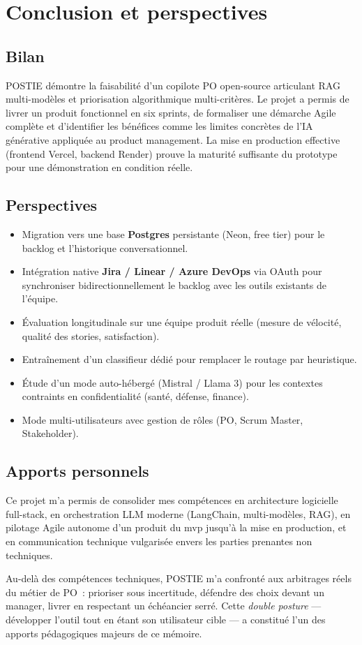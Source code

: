 \chapter{Conclusion et perspectives}
\label{ch:ccl}

\section{Bilan}
POSTIE démontre la faisabilité d'un copilote PO open-source
articulant RAG multi-modèles et priorisation algorithmique
multi-critères. Le projet a permis de livrer un produit fonctionnel
en six sprints, de formaliser une démarche Agile complète et
d'identifier les bénéfices comme les limites concrètes de l'IA
générative appliquée au product management. La mise en production
effective (frontend Vercel, backend Render) prouve la maturité
suffisante du prototype pour une démonstration en condition
réelle.

\section{Perspectives}
\begin{itemize}
  \item Migration vers une base \textbf{Postgres} persistante
        (Neon, free tier) pour le backlog et l'historique
        conversationnel.
  \item Intégration native \textbf{Jira / Linear / Azure DevOps}
        via OAuth pour synchroniser bidirectionnellement le backlog
        avec les outils existants de l'équipe.
  \item Évaluation longitudinale sur une équipe produit réelle
        (mesure de vélocité, qualité des stories, satisfaction).
  \item Entraînement d'un classifieur dédié pour remplacer le
        routage par heuristique.
  \item Étude d'un mode auto-hébergé (Mistral / Llama 3) pour les
        contextes contraints en confidentialité (santé, défense,
        finance).
  \item Mode multi-utilisateurs avec gestion de rôles
        (PO, Scrum Master, Stakeholder).
\end{itemize}

\section{Apports personnels}
Ce projet m'a permis de consolider mes compétences en architecture
logicielle full-stack, en orchestration LLM moderne (LangChain,
multi-modèles, RAG), en pilotage Agile autonome d'un produit du
\gls{mvp} jusqu'à la mise en production, et en communication
technique vulgarisée envers les parties prenantes non techniques.

Au-delà des compétences techniques, POSTIE m'a confronté aux
arbitrages réels du métier de PO~: prioriser sous incertitude,
défendre des choix devant un manager, livrer en respectant un
échéancier serré. Cette \emph{double posture} --- développer
l'outil tout en étant son utilisateur cible --- a constitué l'un
des apports pédagogiques majeurs de ce mémoire.
